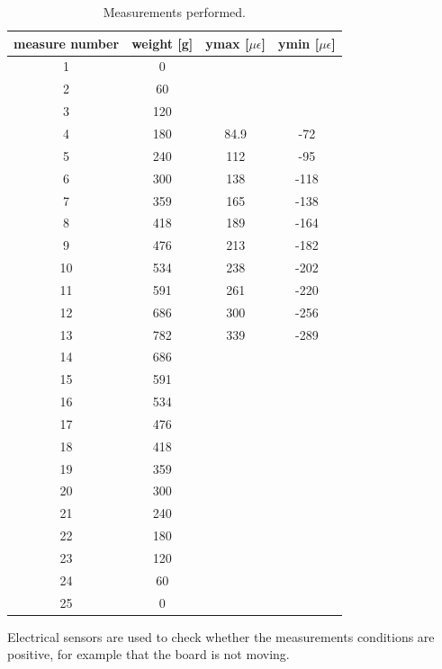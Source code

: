 \begin{table}[H]
  \centering
  \begin{tabular}{c|c|c|c}
      measure number & weight [g] & ymax [$\mu \epsilon$] & ymin [$\mu \epsilon$]\\
			\hline
      1 & 0 &  &  \\
      2 & 60 &  &  \\
      3 & 120 &  &  \\
      4 & 180 & 84.9 & -72 \\
      5 & 240 & 112 & -95 \\
      6 & 300 & 138 & -118 \\
      7 & 359 & 165 & -138 \\
      8 & 418 & 189 & -164 \\
      9 & 476 & 213 & -182 \\
      10 & 534 & 238 & -202 \\
      11 & 591 & 261 & -220 \\
      12 & 686 & 300 & -256 \\
      13 & 782 & 339 & -289 \\
      14 & 686 &  &  \\
      15 & 591 &  &  \\
      16 & 534 &  &  \\
      17 & 476 &  &  \\
      18 & 418 &  &  \\
      19 & 359 &  &  \\
      20 & 300 &  &  \\
      21 & 240 &  &  \\
      22 & 180 &  &  \\
      23 & 120 &  &  \\
      24 & 60 &  &  \\
      25 & 0 &  &  \\
  \end{tabular}
  \caption{Measurements performed.}
  \label{table:measures}
\end{table}
Electrical sensors are used to check whether the measurements conditions are positive, for example that the board is not moving.



